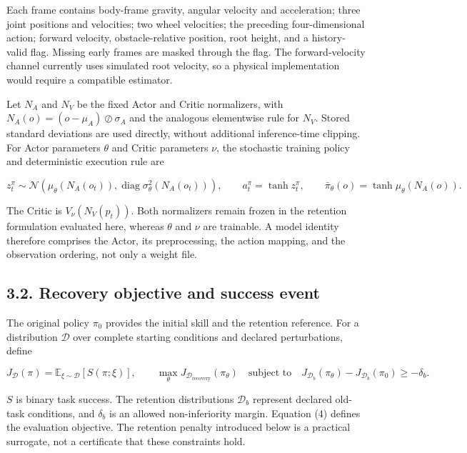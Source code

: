 \documentclass[
  american,
  11pt,
  a4paper,
]{article}
\begin{document}
Each frame contains body-frame gravity, angular velocity and
acceleration; three joint positions and velocities; two wheel
velocities; the preceding four-dimensional action; forward velocity,
obstacle-relative position, root height, and a history-valid flag.
Missing early frames are masked through the flag. The forward-velocity
channel currently uses simulated root velocity, so a physical
implementation would require a compatible estimator.

Let \(N_A\) and \(N_V\) be the fixed Actor and Critic normalizers, with
\(N_A(o)=(o-\mu_A)\oslash\sigma_A\) and the analogous elementwise rule
for \(N_V\). Stored standard deviations are used directly, without
additional inference-time clipping. For Actor parameters \(\theta\) and
Critic parameters \(\nu\), the stochastic training policy and
deterministic execution rule are

\[
z_t^\pi\sim\mathcal N\!\left(\mu_\theta(N_A(o_t)),
\operatorname{diag}\sigma_\theta^2(N_A(o_t))\right),\qquad
a_t^\pi=\tanh z_t^\pi,\qquad
\bar\pi_\theta(o)=\tanh\mu_\theta(N_A(o)).
\tag{3}\label{eq:3}
\]

The Critic is \(V_\nu(N_V(p_t))\). Both normalizers remain frozen in the
retention formulation evaluated here, whereas \(\theta\) and \(\nu\) are
trainable. A model identity therefore comprises the Actor, its
preprocessing, the action mapping, and the observation ordering, not
only a weight file.

\subsection{3.2. Recovery objective and success
event}\label{recovery-objective-and-success-event}

The original policy \(\pi_0\) provides the initial skill and the
retention reference. For a distribution \(\mathcal D\) over complete
starting conditions and declared perturbations, define

\[
J_{\mathcal D}(\pi)=
\mathbb E_{\xi\sim\mathcal D}\!\left[S(\pi;\xi)\right],\qquad
\max_\theta J_{\mathcal D_{\mathrm{recovery}}}(\pi_\theta)
\quad\text{subject to}\quad
J_{\mathcal D_b}(\pi_\theta)-J_{\mathcal D_b}(\pi_0)\ge-\delta_b.
\tag{4}\label{eq:4}
\]

\(S\) is binary task success. The retention distributions
\(\mathcal D_b\) represent declared old-task conditions, and
\(\delta_b\) is an allowed non-inferiority margin. Equation (4) defines
the evaluation objective. The retention penalty introduced below is a
practical surrogate, not a certificate that these constraints hold.
\end{document}

